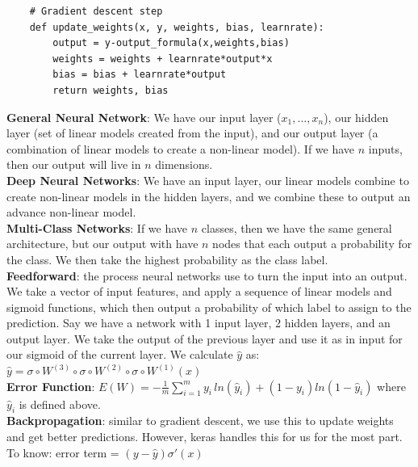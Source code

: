 \documentclass[11pt, a4paper]{article}
\begin{document}
\begin{spacing}{1.1}
\begin{lstlisting}
	# Gradient descent step
	def update_weights(x, y, weights, bias, learnrate):
		output = y-output_formula(x,weights,bias)
		weights = weights + learnrate*output*x
		bias = bias + learnrate*output
		return weights, bias 
	\end{lstlisting} \vspace*{2mm}
	\textbf{General Neural Network}: We have our input layer ($x_1,...,x_n$), our hidden layer (set of linear models created from the input), and our output layer (a combination of linear models to create a non-linear model). If we have $n$ inputs, then our output will live in $n$ dimensions.\vspace*{2mm}\\
	\textbf{Deep Neural Networks}: We have an input layer, our linear models combine to create non-linear models in the hidden layers, and we combine these to output an advance non-linear model.\vspace*{2mm}\\
	\textbf{Multi-Class Networks}: If we have $n$ classes, then we have the same general architecture, but our output with have $n$ nodes that each output a probability for the class. We then take the highest probability as the class label.\vspace*{2mm}\\
	\textbf{Feedforward}: the process neural networks use to turn the input into an output. We take a vector of input features, and apply a sequence of linear models and sigmoid functions, which then output a probability of which label to assign to the prediction. Say we have a network with 1 input layer, 2 hidden layers, and an output layer. We take the output of the previous layer and use it as in input for our sigmoid of the current layer. We calculate $\hat{y}$ as: $\hat{y} = \sigma \circ W^{(3)} \circ \sigma \circ W^{(2)} \circ \sigma \circ W^{(1)}(x)$ \vspace*{2mm}\\
	\textbf{Error Function}: $E(W) = -\frac{1}{m} \sum_{i=1}^m y_i\,  ln(\hat{y}_i) + (1-y_i)ln(1-\hat{y}_i)$ where $\hat{y}_i$ is defined above. \vspace*{2mm}\\
	\textbf{Backpropagation}: similar to gradient descent, we use this to update weights and get better predictions. However, keras handles this for us for the most part. To know: error term = $(y-\hat{y})\sigma'(x)$ \vspace*{1mm}
	

\end{spacing}
\end{document}
